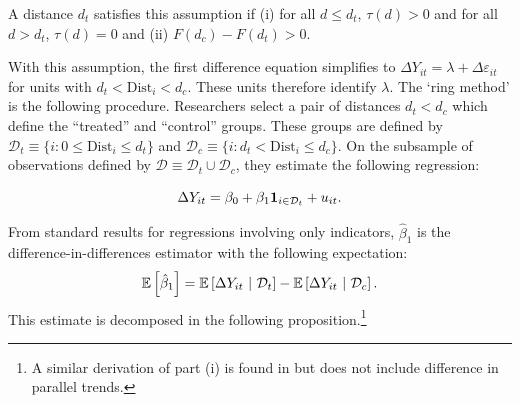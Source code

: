 \documentclass[10pt]{article}
\newcommand{\dist}{\text{Dist}}
\begin{document}
\begin{assumption}[Correct $d_t$]\label{assum:dt}
    A distance $d_t$ satisfies this assumption if (i) for all $d \leq d_t$, $\tau(d) > 0$ and for all $d > d_t$, $\tau(d) = 0$ and (ii) $F(d_c) - F(d_t) > 0$.
\end{assumption}

With this assumption, the first difference equation simplifies to $\Delta Y_{it} = \lambda + \Delta \varepsilon_{it}$ for units with $d_t < \dist_i < d_c$. These units therefore identify $\lambda$. The `ring method' is the following procedure. Researchers select a pair of distances $d_t < d_c$ which define the ``treated'' and ``control'' groups. These groups are defined by $\mathcal{D}_t \equiv \{ i : 0 \leq \dist_i \leq d_t \}$ and $\mathcal{D}_c \equiv \{ i : d_t < \dist_i \leq d_c \}$. On the subsample of observations defined by $\mathcal{D} \equiv \mathcal{D}_t \cup \mathcal{D}_c$, they estimate the following regression:

\begin{equation}\label{eq:ring_method}
    \Delta Y_{it} = \beta_0 + \beta_1 \mathbf{1}_{i \in \mathcal{D}_t} + u_{it}.
\end{equation}

From standard results for regressions involving only indicators, $\hat{\beta}_1$ is the difference-in-differences estimator with the following expectation:
\[
    \mathbb{E}\left[\hat{\beta}_1\right] = \mathbb{E}\left[\Delta Y_{it} \ \vert \ \mathcal{D}_t\right] - \mathbb{E}\left[\Delta Y_{it} \ \vert \ \mathcal{D}_c\right].
\]
This estimate is decomposed in the following proposition.\footnote{A similar derivation of part (i) is found in \citet{Sullivan_2017} but does not include difference in parallel trends.}
\end{document}
